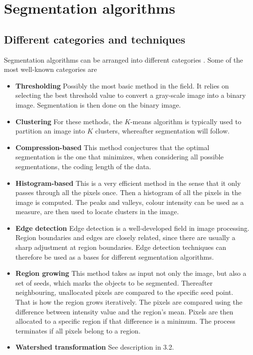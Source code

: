 \documentclass[a4paper,10pt]{article}
\begin{document}
\section{Segmentation algorithms}
\subsection{Different categories and techniques}
Segmentation algorithms can be arranged into different categories \cite{is}. 
Some of the most well-known categories are
\begin{itemize}
 \item \textbf{Thresholding} \cite{is} Possibly the most basic method in the
field.  It relies on selecting the best threshold value to convert a gray-scale
image into a binary image.  Segmentation is then done on the binary image. 
 \item \textbf{Clustering} \cite{is} For these methods, the $K$-means algorithm
is typically used to partition an image into $K$ clusters, whereafter
segmentation will follow.
 \item \textbf{Compression-based} \cite{is} This method conjectures that the
optimal segmentation is the one that minimizes, when considering all possible
segmentations, the coding length of the data.
 \item \textbf{Histogram-based} \cite{is} This is a very efficient method in the
sense that it only passes through all the pixels once.  Then a histogram of all
the pixels in the image is computed.  The peaks and valleys, colour intensity
can be used as a measure, are then used to locate clusters in the image.
 \item \textbf{Edge detection} \cite{is} Edge detection is a well-developed
field in image processing.  Region boundaries and edges are closely related,
since there are usually a sharp adjustment at region boundaries.  Edge detection
techniques can therefore be used as a bases for different segmentation
algorithms.  
 \item \textbf{Region growing} \cite{is}  This method takes as input not only
the image, but also a set of seeds, which marks the objects to be segmented. 
Thereafter neighbouring, unallocated pixels are compared to the specific seed
point.  That is how the region grows iteratively.  The pixels are compared using
the difference between intensity value and the region's mean.  Pixels are then
allocated to a specific region if that difference is a minimum.  The process
terminates if all pixels belong to a region.  
 \item \textbf{Watershed transformation} \cite{is} See description in 3.2.    

\end{itemize}
\end{document}
